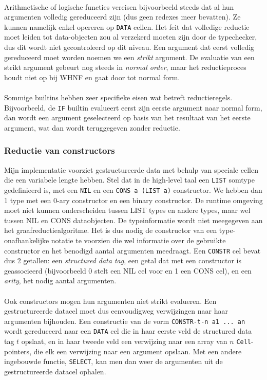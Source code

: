 \documentclass[a4paper,10pt]{article}
\begin{document}
\paragraph{}
Arithmetische of logische functies vereisen bijvoorbeeld steeds dat al hun argumenten volledig gereduceerd zijn (dus geen redexes meer bevatten).
Ze kunnen namelijk enkel opereren op \texttt{DATA} cellen.
Het feit dat volledige reductie moet leiden tot data-objecten zou al verzekerd moeten zijn door de typechecker, dus dit wordt niet gecontroleerd op dit niveau.
Een argument dat eerst volledig gereduceerd moet worden noemen we een \emph{strikt} argument.
De evaluatie van een strikt argument gebeurt nog steeds in \emph{normal order}, maar het reductieproces houdt niet op bij WHNF en gaat door tot normal form.
\paragraph{}
Sommige builtins hebben zeer specifieke eisen wat betreft reductieregels.
Bijvoorbeeld, de \texttt{IF} builtin evalueert eerst zijn eerste argument naar normal form, dan wordt een argument geselecteerd op basis van het resultaat van het eerste argument, wat dan wordt teruggegeven zonder reductie.

\subsubsection{Reductie van constructors}
Mijn implementatie voorziet gestructureerde data met behulp van speciale cellen die een variabele lengte hebben.
Stel dat in de high-level taal een \texttt{LIST} somtype gedefinieerd is, met een \texttt{NIL} en een \texttt{CONS a (LIST a)} constructor.
We hebben dan 1 type met een 0-ary constructor en een binary constructor.
De runtime omgeving moet niet kunnen onderscheiden tussen LIST types en andere types, maar wel tussen NIL en CONS dataobjecten.
De typeinformatie wordt niet meegegeven aan het graafreductiealgoritme.
Het is dus nodig de constructor van een type-onafhankelijke notatie te voorzien die wel informatie over de gebruikte constructor en het benodigd aantal argumenten meedraagt.
Een \texttt{CONSTR} cel bevat dus 2 getallen: een \emph{structured data tag}, een getal dat met een constructor is geassocieerd (bijvoorbeeld 0 stelt een NIL cel voor en 1 een CONS cel), en een \emph{arity}, het nodig aantal argumenten.
\paragraph{}
Ook constructors mogen hun argumenten niet strikt evalueren.
Een gestructureerde datacel moet dus eenvoudigweg verwijzingen naar haar argumenten bijhouden.
Een constructie van de vorm \texttt{CONSTR-t-n a1 ... an} wordt gereduceerd naar een \texttt{DATA} cel die in haar eerste veld de structured data tag $t$ opslaat, en in haar tweede veld een verwijzing naar een array van $n$ \texttt{Cell}-pointers, die elk een verwijzing naar een argument opslaan.
Met een andere ingebouwde functie, \texttt{SELECT}, kan men dan weer de argumenten uit de gestructureerde datacel ophalen.
\end{document}
